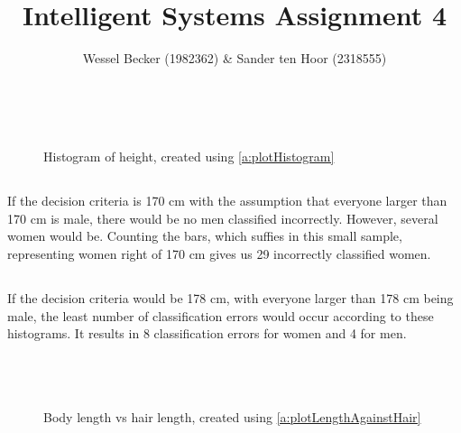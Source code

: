 \documentclass[10pt,a4paper]{article}
\begin{document}
\title{Intelligent Systems Assignment 4}
\author{Wessel Becker (1982362) \& Sander ten Hoor (2318555)}
\maketitle

\newcommand{\simplefigure}[3]{
	\begin{figure}[H]
  	\centering
    	\makebox[\textwidth]
    	{
    		\texttt{[image: \#1]}
 		} \\
  		\caption{#2}
  		\label{#3}
	\end{figure}
}
\newcommand{\mcode}[1]{
	
}

\section{}
\subsection{}
\simplefigure{./images/1_1}{Histogram of height, created using \ref{a:plotHistogram}}{fig:1_1}

\subsection{}
If the decision criteria is 170 cm with the assumption that everyone larger than 170 cm is male, there would be no men classified incorrectly. However, several women would be. Counting the bars, which suffies in this small sample, representing women right of 170 cm gives us 29 incorrectly classified women.

\subsection{}
If the decision criteria would be 178 cm, with everyone larger than 178 cm being male, the least number of classification errors would occur according to these histograms. It results in 8 classification errors for women and 4 for men.

\section{}
\subsection{}
\simplefigure{./images/2_1}{Body length vs hair length, created using \ref{a:plotLengthAgainstHair}}{fig:2_1}
\end{document}
